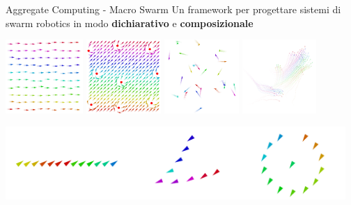 \documentclass[presentation, 10pt,aspectratio=169]{beamer}\mode<presentation>{\usetheme{AMSBolognaFC}}
\begin{document}
\begin{frame}{Aggregate Computing - Macro Swarm}
	Un framework per progettare sistemi di swarm robotics in modo \textbf{dichiarativo} e \textbf{composizionale}
	\begin{center}
		\includegraphics[height=2.8cm]{img/constant-movement.png}
		\includegraphics[height=2.8cm]{img/obstracle.png}		
		\includegraphics[height=2.8cm]{img/explore-2.png}
		\includegraphics[height=2.8cm]{img/flock.png}
	  \end{center}
	  \begin{center}
		\href{https://github.com/scafi/macro-swarm}{
		\includegraphics[height=2.8cm]{img/shapes.png}}
	  \end{center}
\end{frame}
\end{document}

